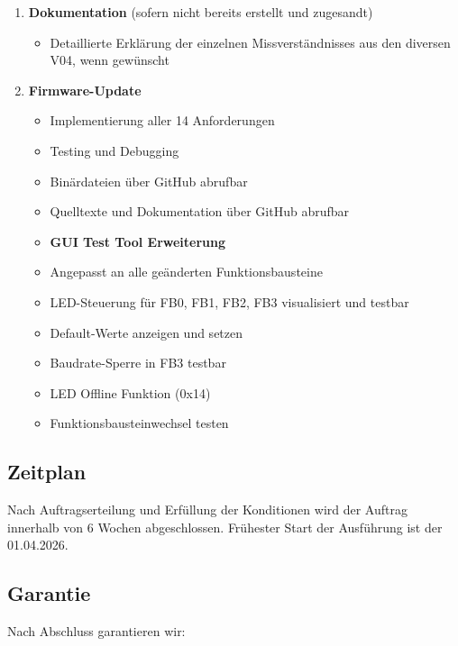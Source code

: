 \documentclass[a4paper,11pt]{article}
\providecommand{\tightlist}{\setlength{\itemsep}{0pt}\setlength{\parskip}{0pt}}
\begin{document}
\begin{enumerate}
\def\labelenumi{\arabic{enumi}.}
\item
  \textbf{Dokumentation} (sofern nicht bereits erstellt und zugesandt)

  \begin{itemize}
  \tightlist
  \item
    Detaillierte Erklärung der einzelnen Missverständnisses aus den
    diversen V04, wenn gewünscht
  \end{itemize}
\item
  \textbf{Firmware-Update}

  \begin{itemize}
  \item
    Implementierung aller 14 Anforderungen
  \item
    Testing und Debugging
  \item
    Binärdateien über GitHub abrufbar
  \item
    Quelltexte und Dokumentation über GitHub abrufbar
  \item
    \textbf{GUI Test Tool Erweiterung}
  \item
    Angepasst an alle geänderten Funktionsbausteine
  \item
    LED-Steuerung für FB0, FB1, FB2, FB3 visualisiert und testbar
  \item
    Default-Werte anzeigen und setzen
  \item
    Baudrate-Sperre in FB3 testbar
  \item
    LED Offline Funktion (0x14)
  \item
    Funktionsbausteinwechsel testen
  \end{itemize}
\end{enumerate}

\hypertarget{zeitplan}{%
\subsection{Zeitplan}\label{zeitplan}}

Nach Auftragserteilung und Erfüllung der Konditionen wird der Auftrag
innerhalb von 6 Wochen abgeschlossen. Frühester Start der Ausführung ist
der 01.04.2026.

\hypertarget{garantie}{%
\subsection{Garantie}\label{garantie}}

Nach Abschluss garantieren wir:
\end{document}
